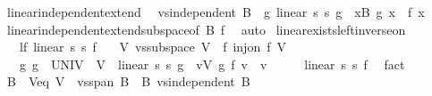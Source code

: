 \begin{isabellebody}
\endisatagproof
{\isafoldproof}%
%
\isadelimproof
\isanewline
%
\endisadelimproof
\isanewline
{}\isamarkupfalse%
\ linear{\isacharunderscore}{\kern0pt}independent{\isacharunderscore}{\kern0pt}extend{\isacharcolon}{\kern0pt}\isanewline
\ \ {\isachardoublequoteopen}vs{}{\isachardot}{\kern0pt}independent\ B\ {\isasymLongrightarrow}\ {\isasymexists}g{\isachardot}{\kern0pt}\ linear\ s{}\ s{}\ g\ {\isasymand}\ {\isacharparenleft}{\kern0pt}{\isasymforall}x{\isasymin}B{\isachardot}{\kern0pt}\ g\ x\ {\isacharequal}{\kern0pt}\ f\ x{\isacharparenright}{\kern0pt}{\isachardoublequoteclose}\isanewline
%
\isadelimproof
\ \ %
\endisadelimproof
%
\isatagproof
{}\isamarkupfalse%
\ linear{\isacharunderscore}{\kern0pt}independent{\isacharunderscore}{\kern0pt}extend{\isacharunderscore}{\kern0pt}subspace{\isacharbrackleft}{\kern0pt}of\ B\ f{\isacharbrackright}{\kern0pt}\ \isamarkupfalse%
\ auto%
\endisatagproof
{\isafoldproof}%
%
\isadelimproof
\isanewline
%
\endisadelimproof
\isanewline
{}\isamarkupfalse%
\ linear{\isacharunderscore}{\kern0pt}exists{\isacharunderscore}{\kern0pt}left{\isacharunderscore}{\kern0pt}inverse{\isacharunderscore}{\kern0pt}on{\isacharcolon}{\kern0pt}\isanewline
\ \ \ lf{\isacharcolon}{\kern0pt}\ {\isachardoublequoteopen}linear\ s{}\ s{}\ f{\isachardoublequoteclose}\isanewline
\ \ \ V{\isacharcolon}{\kern0pt}\ {\isachardoublequoteopen}vs{}{\isachardot}{\kern0pt}subspace\ V{\isachardoublequoteclose}\ \ f{\isacharcolon}{\kern0pt}\ {\isachardoublequoteopen}inj{\isacharunderscore}{\kern0pt}on\ f\ V{\isachardoublequoteclose}\isanewline
\ \ \ {\isachardoublequoteopen}{\isasymexists}g{\isachardot}{\kern0pt}\ g\ {\isacharbackquote}{\kern0pt}\ UNIV\ {\isasymsubseteq}\ V\ {\isasymand}\ linear\ s{}\ s{}\ g\ {\isasymand}\ {\isacharparenleft}{\kern0pt}{\isasymforall}v{\isasymin}V{\isachardot}{\kern0pt}\ g\ {\isacharparenleft}{\kern0pt}f\ v{\isacharparenright}{\kern0pt}\ {\isacharequal}{\kern0pt}\ v{\isacharparenright}{\kern0pt}{\isachardoublequoteclose}\isanewline
%
\isadelimproof
%
\endisadelimproof
%
\isatagproof
{}\isamarkupfalse%
\ {\isacharminus}{\kern0pt}\isanewline
\ \ \isamarkupfalse%
\ linear\ s{}\ s{}\ f\ \isamarkupfalse%
\ fact\isanewline
\ \ \isamarkupfalse%
\ B\ \ V{\isacharunderscore}{\kern0pt}eq{\isacharcolon}{\kern0pt}\ {\isachardoublequoteopen}V\ {\isacharequal}{\kern0pt}\ vs{}{\isachardot}{\kern0pt}span\ B{\isachardoublequoteclose}\ \ B{\isacharcolon}{\kern0pt}\ {\isachardoublequoteopen}vs{}{\isachardot}{\kern0pt}independent\ B{\isachardoublequoteclose}\isanewline

\end{isabellebody}

